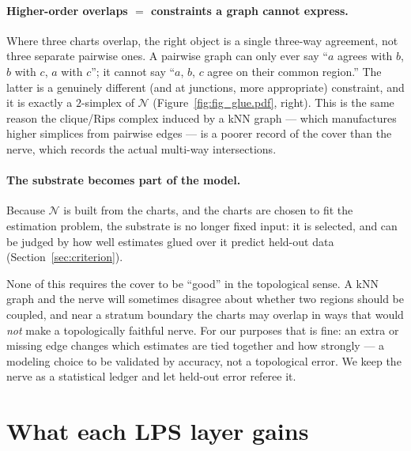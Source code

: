 \documentclass[11pt]{article}
\theoremstyle{definition}
\newcommand{\nerve}{\mathcal{N}}
\begin{document}
\paragraph{Higher-order overlaps $=$ constraints a graph cannot express.} Where
three charts overlap, the right object is a single three-way agreement, not three
separate pairwise ones. A pairwise graph can only ever say ``$a$ agrees with $b$,
$b$ with $c$, $a$ with $c$''; it cannot say ``$a$, $b$, $c$ agree on their common
region.'' The latter is a genuinely different (and at junctions, more appropriate)
constraint, and it is exactly a $2$-simplex of $\nerve$ (Figure~\ref{fig:fig_glue.pdf},
right). This is the same reason the clique/Rips complex induced by a kNN graph ---
which manufactures higher simplices from pairwise edges --- is a poorer record of
the cover than the nerve, which records the actual multi-way intersections.

\paragraph{The substrate becomes part of the model.} Because $\nerve$ is built
from the charts, and the charts are chosen to fit the estimation problem, the
substrate is no longer fixed input: it is selected, and can be judged by how well
estimates glued over it predict held-out data (Section~\ref{sec:criterion}).

\begin{caution}
None of this requires the cover to be ``good'' in the topological sense. A kNN
graph and the nerve will sometimes disagree about whether two regions should be
coupled, and near a stratum boundary the charts may overlap in ways that would
\emph{not} make a topologically faithful nerve. For our purposes that is fine:
an extra or missing edge changes which estimates are tied together and how
strongly --- a modeling choice to be validated by accuracy, not a topological
error. We keep the nerve as a statistical ledger and let held-out error referee it.
\end{caution}

\section{What each LPS layer gains}\label{sec:gains}
\end{document}
